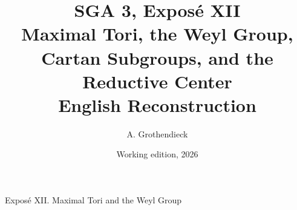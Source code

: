 \documentclass[11pt,a4paper,oneside,leqno]{book}
\title{SGA 3, Exposé XII\\Maximal Tori, the Weyl Group, Cartan
Subgroups, and the Reductive Center\\English Reconstruction}
\author{A. Grothendieck}
\date{Working edition, 2026}
\begin{document}
\frontmatter
\maketitle
\tableofcontents
\mainmatter

  {Exposé XII. Maximal Tori and the Weyl Group}



\end{document}
